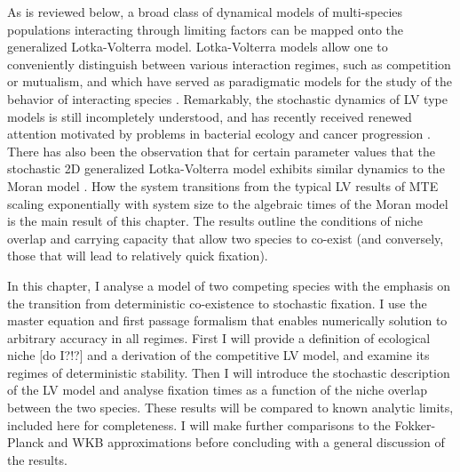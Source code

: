 As is reviewed below, a broad class of dynamical models of multi-species populations interacting through limiting factors can be mapped onto the generalized Lotka-Volterra model. 
Lotka-Volterra models allow one to conveniently distinguish between various interaction regimes, such as competition or mutualism, and which have served as paradigmatic models for the study of the behavior of interacting species \cite{Volterra1926,Bomze1983,Chesson1990,Antal2006,Chotibut2015,Dobrinevski2012,Fisher2014,Constable2015,Lin2012,Gabel2013,Kessler2015,Young2018}. 
Remarkably, the stochastic dynamics of LV type models is still incompletely understood, and has recently received renewed attention motivated by problems in bacterial ecology and cancer progression \cite{VanMelderen2009,Stirk2010,Fisher2014,Chotibut2015,Capitan2017,Kessler2014}. %
There has also been the observation that for certain parameter values that the stochastic 2D generalized Lotka-Volterra model exhibits similar dynamics to the Moran model \cite{Lin2012,Constable2015,Chotibut2015,Young2018}. 
How the system transitions from the typical LV results of MTE scaling exponentially with system size to the algebraic times of the Moran model is the main result of this chapter. 
The results outline the conditions of niche overlap and carrying capacity that allow two species to co-exist (and conversely, those that will lead to relatively quick fixation). 

In this chapter, I analyse a model of two competing species with the emphasis on the transition from deterministic co-existence to stochastic fixation. %
I use the master equation and first passage formalism that enables numerically solution to arbitrary accuracy in all regimes. %
First I will provide a definition of ecological niche [do I?!?] and a derivation of the competitive LV model, and examine its regimes of deterministic stability. 
Then I will introduce the stochastic description of the LV model and analyse fixation times as a function of the niche overlap between the two species. 
These results will be compared to known analytic limits, included here for completeness. 
I will make further comparisons to the Fokker-Planck and WKB approximations before concluding with a general discussion of the results. 


